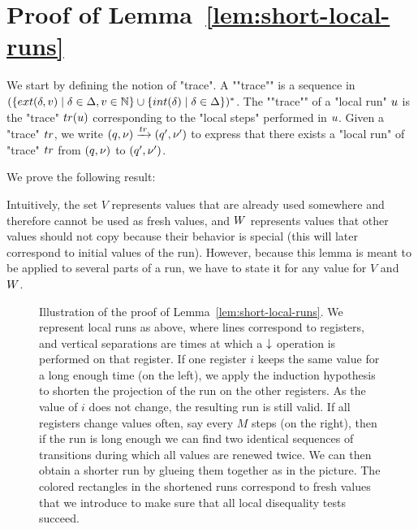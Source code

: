 \section{Proof of Lemma~\ref{lem:short-local-runs}}
\label{app:tower-lemma}

	We start by defining the notion of "trace". 
	\AP A ""trace"" is a sequence in $(\set{\extlabel{\atrans}{\aval} \mid \atrans \in \transitions, \aval \in \nats} \cup \set{\intlabel{\atrans} \mid \atrans \in \transitions})^*$. The ""trace"" of a "local run" $u$ is the "trace" $\trace{\localrun}$ corresponding to the "local steps" performed in $u$. Given a "trace" $\atrace$, we write $(q,\localdata) \step{\atrace} (q',\localdata')$ to express that there exists a "local run" of "trace" $\atrace$ from $(q,\nu)$ to $(q',\nu')$. %


We prove the following result:

\lemShortLocalRuns*

Intuitively, the set $V$ represents values that are already used somewhere and therefore cannot be used as fresh values, and $W$ represents values that other values should not copy because their behavior is special (this will later correspond to initial values of the run). However, because this lemma is meant to be applied to several parts of a run, we have to state it for any value for $V$ and $W$.  

\begin{figure}
	
	\caption{Illustration of the proof of Lemma~\ref{lem:short-local-runs}. We represent local runs as above, where lines correspond to registers, and vertical separations are times at which a $\downarrow$ operation is performed on that register. If one register $i$ keeps the same value for a long enough time (on the left), we apply the induction hypothesis to shorten the projection of the run on the other registers. As the value of $i$ does not change, the resulting run is still valid. If all registers change values often, say every $M$ steps (on the right), then if the run is long enough we can find two identical sequences of transitions during which all values are renewed twice. We can then obtain a shorter run by glueing them together as in the picture. The colored rectangles in the shortened runs correspond to fresh values that we introduce to make sure that all local disequality tests succeed.}
	\label{fig:pumping}
\end{figure}

